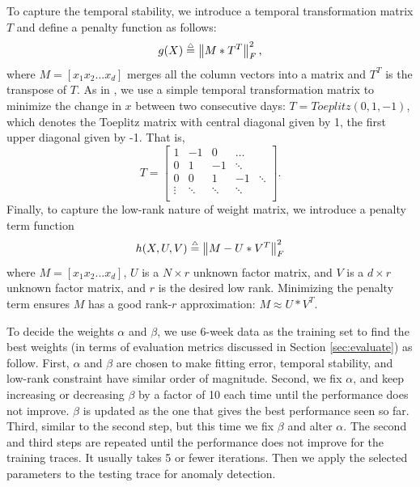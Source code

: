 To capture the temporal stability, we introduce
a temporal transformation matrix $T$ and define a penalty
function as follows:
\begin{equation}
g(X) \stackrel{\scriptscriptstyle{\triangle}}{=} \left\| M \ast T^T\right\|_F^2,
\end{equation}
where $M = [x_1 x_2 ... x_d]$ merges all the column vectors into a
matrix and $T^T$ is the transpose of $T$. As in \cite{zhang09sensing}, we use a simple temporal
transformation matrix to minimize the change in $x$ between two consecutive days:
$T=Toeplitz(0,1,-1)$, which denotes the Toeplitz matrix 
with central diagonal given by 1, the first upper diagonal given by -1. That is, 
{\scriptsize
\begin{equation}
 T = \left[
  \begin{array}{rrrrrrrr}
        1 & -1 &  0 &  \ldots \\
        0 &  1 & -1 &  \ddots \\
        0 &  0 &  1 & -1 & \ddots \\
        \vdots &  \ddots &  \ddots &  \ddots   \\
  \end{array} \right].
\end{equation}
}
Finally, to capture the low-rank nature of weight matrix, we
introduce a penalty term function
\begin{equation}
h(X,U,V) \stackrel{\scriptscriptstyle{\triangle}}{=} \left\|M - U\ast V^T\right\|_F^2
\end{equation}
where $M = [x_1 x_2 ... x_d]$, $U$ is a $N \times r$ unknown factor matrix, and $V$ is a
$d \times r$ unknown factor matrix, and $r$ is the desired low
rank.  Minimizing the penalty term ensures $M$ has a good rank-$r$
approximation: $M \approx           
U\ast V^T$.

To decide the weights $\alpha$ and $\beta$, we use 6-week data as the 
training set to find the best weights (in terms of evaluation metrics 
discussed in Section \ref{sec:evaluate}) as follow.
First, 
$\alpha$ and $\beta$ are chosen to make fitting error, temporal stability, 
and low-rank constraint have similar order of magnitude. Second, we
fix $\alpha$, and keep increasing or decreasing $\beta$ by a factor of
10 each time until the performance does not improve. 
$\beta$ is updated as the one that gives the best performance seen so far. Third, similar to the second step, 
but this time we fix $\beta$ and alter $\alpha$. The second and third
steps are repeated until the performance does not improve for the
training traces. It usually takes 5 or fewer iterations. 
Then we apply the selected parameters to the testing
trace for anomaly detection. 

